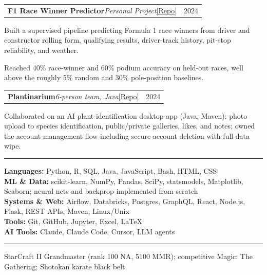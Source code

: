 \documentclass[letterpaper,10pt]{article}
\makeatletter
\newcommand{\Section}[1]{\vspace{4pt}{\large\bfseries #1}\vspace{1pt}\hrule\vspace{3pt}}
\newcommand{\projentry}[2]{%
  \vspace{2pt}%
  \begin{tabular*}{\textwidth}{@{}l@{\extracolsep{\fill}}r@{}}
    #1 & #2 \\
  \end{tabular*}\vspace{-4pt}}
\newenvironment{bullets}%
  {\begin{list}{\textbullet}{%
     \setlength{\leftmargin}{1.3em}\setlength{\labelsep}{0.5em}%
     \setlength{\itemsep}{1.5pt}\setlength{\topsep}{2pt}%
     \setlength{\parsep}{0pt}\setlength{\partopsep}{0pt}}}%
  {\end{list}}
\makeatother
\begin{document}
\projentry{\textbf{F1 Race Winner Predictor}\quad\textit{Personal Project}\quad\href{https://github.com/Avi-Gobrin/F1-Race-predictor}{[Repo]}}{2024}
\begin{bullets}
  \item Built a supervised pipeline predicting Formula 1 race winners from driver and constructor rolling form, qualifying results, driver-track history, pit-stop reliability, and weather.
  \item Reached 40\% race-winner and 60\% podium accuracy on held-out races, well above the roughly 5\% random and 30\% pole-position baselines.
\end{bullets}
\projentry{\textbf{Plantinarium}\quad\textit{6-person team, Java}\quad\href{https://github.com/barnaste/plantinarium}{[Repo]}}{2024}
\begin{bullets}
  \item Collaborated on an AI plant-identification desktop app (Java, Maven): photo upload to species identification, public/private galleries, likes, and notes; owned the account-management flow including secure account deletion with full data wipe.
\end{bullets}

\Section{Technical Skills}
\textbf{Languages:} Python, R, SQL, Java, JavaScript, Bash, HTML, CSS \\
\textbf{ML \& Data:} scikit-learn, NumPy, Pandas, SciPy, statsmodels, Matplotlib, Seaborn; neural nets and backprop implemented from scratch \\
\textbf{Systems \& Web:} Airflow, Databricks, Postgres, GraphQL, React, Node.js, Flask, REST APIs, Maven, Linux/Unix \\
\textbf{Tools:} Git, GitHub, Jupyter, Excel, \LaTeX \\
\textbf{AI Tools:} Claude, Claude Code, Cursor, LLM agents

\Section{Additional}
StarCraft II Grandmaster (rank 100 NA, 5100 MMR); competitive Magic: The Gathering; Shotokan karate black belt.
\end{document}
